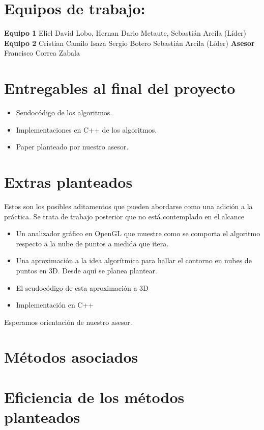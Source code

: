 \documentclass[final, 12pt letterpaper]{article}
\begin{document}
\section{Equipos de trabajo:}
\textbf{Equipo 1}
Eliel David Lobo, 
Hernan Dario Metaute, 
Sebastián Arcila (Líder)
\linebreak 
\textbf{Equipo 2}
Cristian Camilo Isaza
Sergio Botero
Sebastián Arcila (Líder)
\linebreak 
\textbf{Asesor}
Francisco Correa Zabala
\section{Entregables al final del proyecto}
\begin{itemize}
\item Seudocódigo de los algoritmos.
\item Implementaciones en C++ de los algoritmos.
\item Paper planteado por nuestro asesor.
\end{itemize}
\section{Extras planteados}
Estos son los posibles aditamentos que pueden abordarse como una adición a la práctica. Se trata de trabajo posterior que no está contemplado en el alcance
\begin{itemize}
\item Un analizador gráfico en OpenGL que muestre como se comporta el algoritmo respecto a la nube de puntos a medida que itera.
\item Una aproximación a la idea algorítmica para hallar el contorno en nubes de puntos en 3D. Desde aquí se planea plantear.
\item El seudocódigo de esta aproximación a 3D
\item Implementación en C++
\end{itemize}
Esperamos orientación de nuestro asesor.
\section{Métodos asociados}
\cite{AN-NUMERICO}

\section{Eficiencia de los métodos planteados}
\end{document}
